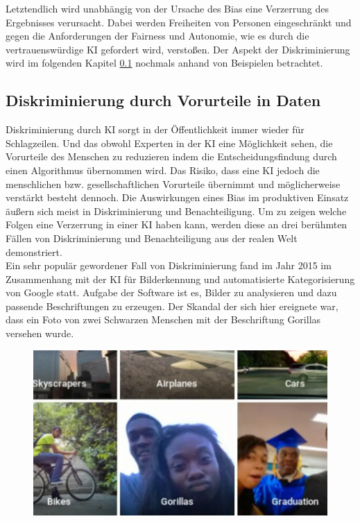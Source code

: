 \begin{onehalfspace}
        Letztendlich wird unabhängig von der Ursache des Bias eine Verzerrung des Ergebnisses verursacht. Dabei werden Freiheiten von Personen eingeschränkt und gegen die Anforderungen der Fairness und Autonomie, wie es durch die vertrauenswürdige \ac*{KI} gefordert wird, verstoßen. Der Aspekt der Diskriminierung wird im folgenden Kapitel \ref*{subsubsec:diskriminierungdurchverzerrung} nochmals anhand von Beispielen betrachtet.\cite{HEGKI2019Definition}\cite{Fabi2022}

    \subsection{Diskriminierung durch Vorurteile in Daten}
    \label{subsubsec:diskriminierungdurchverzerrung}
        Diskriminierung durch \ac*{KI} sorgt in der Öffentlichkeit immer wieder für Schlagzeilen.\cite{Cremers2019} Und das obwohl Experten in der \ac*{KI} eine Möglichkeit sehen, die Vorurteile des Menschen zu reduzieren indem die Entscheidungsfindung durch einen Algorithmus übernommen wird. Das Risiko, dass eine \ac*{KI} jedoch die menschlichen bzw. gesellschaftlichen Vorurteile übernimmt und möglicherweise verstärkt besteht dennoch.\cite{silberg2019notes} Die Auswirkungen eines Bias im produktiven Einsatz äußern sich meist in Diskriminierung und Benachteiligung. 
        Um zu zeigen welche Folgen eine Verzerrung in einer \ac*{KI} haben kann, werden diese an drei berühmten Fällen von Diskriminierung und Benachteiligung aus der realen Welt demonstriert.
        \\
        Ein sehr populär gewordener Fall von Diskriminierung fand im Jahr 2015 im Zusammenhang mit der \ac*{KI} für Bilderkennung und automatisierte Kategorisierung von Google statt. Aufgabe der Software ist es, Bilder zu analysieren und dazu passende Beschriftungen zu erzeugen. Der Skandal der sich hier ereignete war, dass ein Foto von zwei Schwarzen Menschen mit der Beschriftung \glqq{}Gorillas\grqq{} versehen wurde.\cite{Cremers2019}\cite{IncidentDatabase2015_16}
        \begin{figure}[h]
            \centering
            \includegraphics[width = 11.5cm]{Bilder/Gorillas.png}

\end{figure}
\end{onehalfspace}
